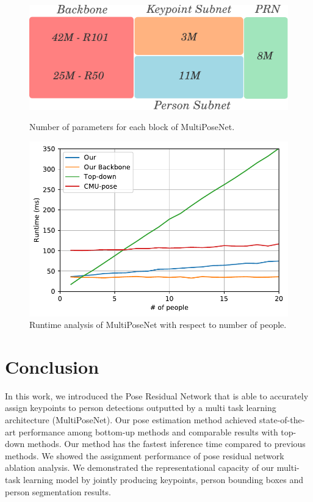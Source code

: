\documentclass[runningheads]{llncs}
\begin{document}
\begin{figure}[!tbp]
  \centering
  \begin{minipage}[b]{0.47\textwidth}
    \includegraphics[width=\textwidth]{Figures/params.pdf}
    \caption{Number of parameters for each block of MultiPoseNet.}
   \label{fig:params}
  \end{minipage}
  \hfill
  \begin{minipage}[b]{0.47\textwidth}
    \includegraphics[width=\textwidth]{Figures/runtime.pdf}
    \caption{Runtime analysis of MultiPoseNet with respect to number of people.}
   \label{fig:runtime}
  \end{minipage}
\end{figure}






\section{Conclusion} 
In this work, we introduced the Pose Residual Network that is able to accurately assign keypoints to  person detections outputted by a multi task learning architecture (MultiPoseNet). Our pose estimation method achieved state-of-the-art performance among bottom-up methods and comparable results with top-down methods. Our method has  the fastest inference time compared to previous methods.  We showed the assignment performance of pose residual network  ablation analysis. We demonstrated the representational capacity of our multi-task learning model by jointly producing keypoints, person bounding boxes and person segmentation results.
\pagebreak


\end{document}
